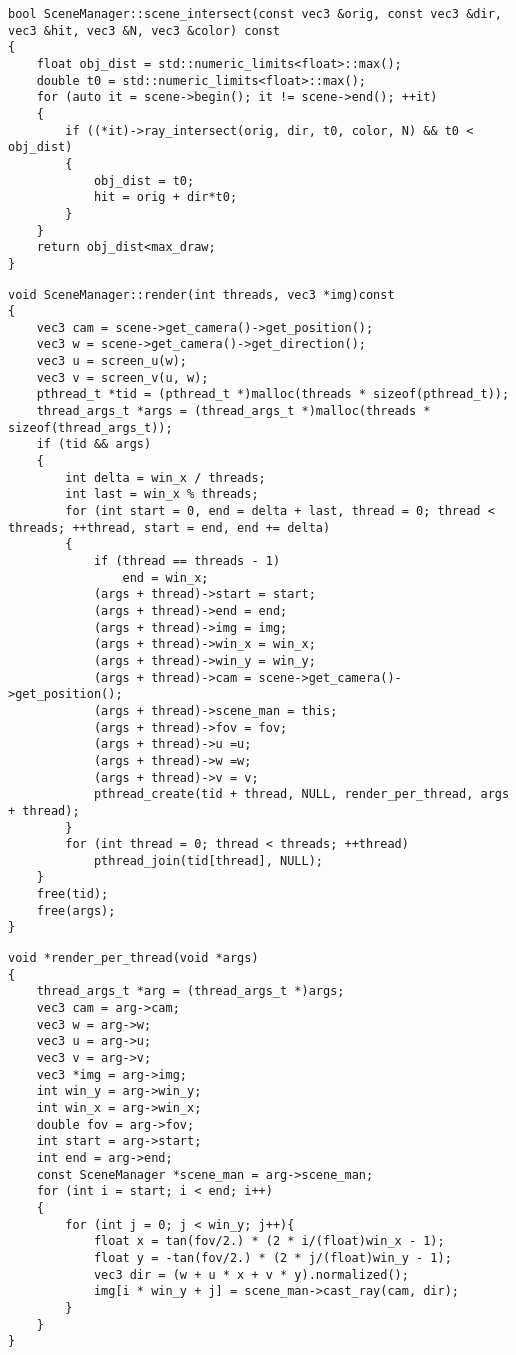 \begin{lstlisting}[caption=Функция определения факта пересечения луча с объектом сцены]
bool SceneManager::scene_intersect(const vec3 &orig, const vec3 &dir, vec3 &hit, vec3 &N, vec3 &color) const
{
	float obj_dist = std::numeric_limits<float>::max();
	double t0 = std::numeric_limits<float>::max();
	for (auto it = scene->begin(); it != scene->end(); ++it)
	{
		if ((*it)->ray_intersect(orig, dir, t0, color, N) && t0 < obj_dist)
		{
			obj_dist = t0;
			hit = orig + dir*t0;
		}
	}
	return obj_dist<max_draw;
}

\end{lstlisting}

\begin{lstlisting}[caption=Функция создания дополнительных потоков для распараллеливания процесса отрисовки]
void SceneManager::render(int threads, vec3 *img)const
{
	vec3 cam = scene->get_camera()->get_position();
	vec3 w = scene->get_camera()->get_direction();
	vec3 u = screen_u(w);
	vec3 v = screen_v(u, w);
	pthread_t *tid = (pthread_t *)malloc(threads * sizeof(pthread_t));
	thread_args_t *args = (thread_args_t *)malloc(threads * sizeof(thread_args_t));
	if (tid && args)
	{
		int delta = win_x / threads;
		int last = win_x % threads;
		for (int start = 0, end = delta + last, thread = 0; thread < threads; ++thread, start = end, end += delta)
		{
			if (thread == threads - 1)
				end = win_x;
			(args + thread)->start = start;
			(args + thread)->end = end;
			(args + thread)->img = img;
			(args + thread)->win_x = win_x;
			(args + thread)->win_y = win_y;
			(args + thread)->cam = scene->get_camera()->get_position();
			(args + thread)->scene_man = this;
			(args + thread)->fov = fov;
			(args + thread)->u =u;
			(args + thread)->w =w;
			(args + thread)->v = v;
			pthread_create(tid + thread, NULL, render_per_thread, args + thread);
		}
		for (int thread = 0; thread < threads; ++thread)
			pthread_join(tid[thread], NULL);
	}
	free(tid);
	free(args);
}
\end{lstlisting}

\begin{lstlisting}[caption=Функция работы одного потока для участия в процессе отрисовки]
void *render_per_thread(void *args)
{
	thread_args_t *arg = (thread_args_t *)args;
	vec3 cam = arg->cam;
	vec3 w = arg->w;
	vec3 u = arg->u;
	vec3 v = arg->v;
	vec3 *img = arg->img;
	int win_y = arg->win_y;
	int win_x = arg->win_x;
	double fov = arg->fov;
	int start = arg->start;
	int end = arg->end;
	const SceneManager *scene_man = arg->scene_man;
	for (int i = start; i < end; i++)
	{
		for (int j = 0; j < win_y; j++){
			float x = tan(fov/2.) * (2 * i/(float)win_x - 1);
			float y = -tan(fov/2.) * (2 * j/(float)win_y - 1);
			vec3 dir = (w + u * x + v * y).normalized();
			img[i * win_y + j] = scene_man->cast_ray(cam, dir);
		}
	}
}
\end{lstlisting}

